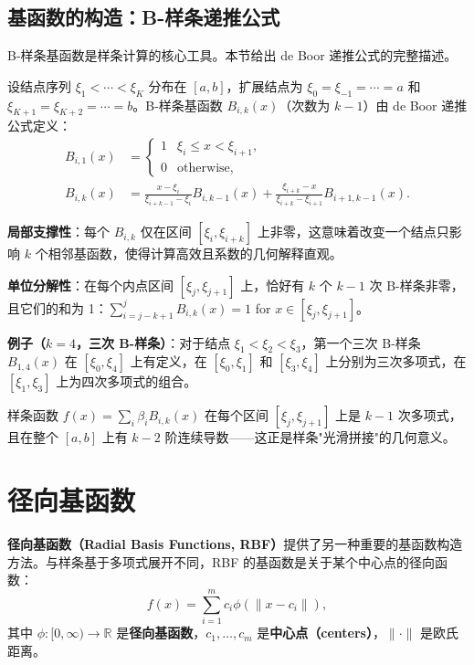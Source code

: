 \subsection{基函数的构造：B-样条递推公式}\label{sec:b-spline-construction}

B-样条基函数是样条计算的核心工具。本节给出 de Boor 递推公式的完整描述。

设结点序列 $\xi_1 < \cdots < \xi_K$ 分布在 $[a, b]$，扩展结点为 $\xi_0 = \xi_{-1} = \cdots = a$ 和 $\xi_{K+1} = \xi_{K+2} = \cdots = b$。B-样条基函数 $B_{i,k}(x)$（次数为 $k-1$）由 de Boor 递推公式定义：
\begin{align}
B_{i,1}(x) &= \begin{cases} 1 & \xi_i \leq x < \xi_{i+1}, \\ 0 & \text{otherwise}, \end{cases} \label{eq:de-boor-base} \\
B_{i,k}(x) &= \frac{x - \xi_i}{\xi_{i+k-1} - \xi_i} B_{i,k-1}(x) + \frac{\xi_{i+k} - x}{\xi_{i+k} - \xi_{i+1}} B_{i+1,k-1}(x). \label{eq:de-boor-recursion}
\end{align}

\textbf{局部支撑性}：每个 $B_{i,k}$ 仅在区间 $[\xi_i, \xi_{i+k}]$ 上非零，这意味着改变一个结点只影响 $k$ 个相邻基函数，使得计算高效且系数的几何解释直观。

\textbf{单位分解性}：在每个内点区间 $[\xi_j, \xi_{j+1}]$ 上，恰好有 $k$ 个 $k-1$ 次 B-样条非零，且它们的和为 1：$\sum_{i=j-k+1}^{j} B_{i,k}(x) = 1$ for $x \in [\xi_j, \xi_{j+1}]$。

\textbf{例子（$k=4$，三次 B-样条）}：对于结点 $\xi_1 < \xi_2 < \xi_3$，第一个三次 B-样条 $B_{1,4}(x)$ 在 $[\xi_0, \xi_4]$ 上有定义，在 $[\xi_0, \xi_1]$ 和 $[\xi_3, \xi_4]$ 上分别为三次多项式，在 $[\xi_1, \xi_3]$ 上为四次多项式的组合。

样条函数 $f(x) = \sum_i \beta_i B_{i,k}(x)$ 在每个区间 $[\xi_j, \xi_{j+1}]$ 上是 $k-1$ 次多项式，且在整个 $[a, b]$ 上有 $k-2$ 阶连续导数——这正是样条"光滑拼接"的几何意义。

\section{径向基函数}\label{sec:radial-basis-functions}

\textbf{径向基函数（Radial Basis Functions, RBF）}提供了另一种重要的基函数构造方法。与样条基于多项式展开不同，RBF 的基函数是关于某个中心点的径向函数：
\begin{equation}
f(x) = \sum_{i=1}^{m} c_i \phi(\|x - c_i\|),
\label{eq:rbf-expansion}
\end{equation}
其中 $\phi: [0, \infty) \to \mathbb{R}$ 是\textbf{径向基函数}，$c_1, \ldots, c_m$ 是\textbf{中心点（centers）}，$\|\cdot\|$ 是欧氏距离。

